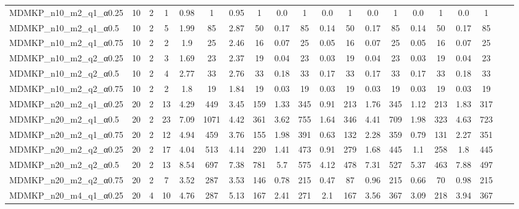 \begin{table}
{\begin{tabular}{lccccccccccccccccccc}
MDMKP\_n10\_m2\_q1\_α0.25 & 10 & 2 & 1 & 0.98 & 1 & 0.95 & 1 &  \textcolor{blue2}{0.0} & 1 &  \textcolor{blue2}{0.0} & 1 &  \textcolor{blue2}{0.0} & 1 &  \textcolor{blue2}{0.0} & 1 &  \textcolor{blue2}{0.0} & 1 \\
MDMKP\_n10\_m2\_q1\_α0.5 & 10 & 2 & 5 & 1.99 & 85 & 2.87 & 50 & 0.17 & 85 &  \textcolor{blue2}{0.14} & 50 & 0.17 & 85 &  \textcolor{blue2}{0.14} & 50 & 0.17 & 85 \\
MDMKP\_n10\_m2\_q1\_α0.75 & 10 & 2 & 2 & 1.9 & 25 & 2.46 & 16 & 0.07 & 25 &  \textcolor{blue2}{0.05} & 16 & 0.07 & 25 &  \textcolor{blue2}{0.05} & 16 & 0.07 & 25 \\
MDMKP\_n10\_m2\_q2\_α0.25 & 10 & 2 & 3 & 1.69 & 23 & 2.37 & 19 & 0.04 & 23 &  \textcolor{blue2}{0.03} & 19 & 0.04 & 23 &  \textcolor{blue2}{0.03} & 19 & 0.04 & 23 \\
MDMKP\_n10\_m2\_q2\_α0.5 & 10 & 2 & 4 & 2.77 & 33 & 2.76 & 33 & 0.18 & 33 &  \textcolor{blue2}{0.17} & 33 &  \textcolor{blue2}{0.17} & 33 &  \textcolor{blue2}{0.17} & 33 & 0.18 & 33 \\
MDMKP\_n10\_m2\_q2\_α0.75 & 10 & 2 & 2 & 1.8 & 19 & 1.84 & 19 &  \textcolor{blue2}{0.03} & 19 &  \textcolor{blue2}{0.03} & 19 &  \textcolor{blue2}{0.03} & 19 &  \textcolor{blue2}{0.03} & 19 &  \textcolor{blue2}{0.03} & 19 \\
MDMKP\_n20\_m2\_q1\_α0.25 & 20 & 2 & 13 & 4.29 & 449 & 3.45 & 159 & 1.33 & 345 &  \textcolor{blue2}{0.91} & 213 & 1.76 & 345 & 1.12 & 213 & 1.83 & 317 \\
MDMKP\_n20\_m2\_q1\_α0.5 & 20 & 2 & 23 & 7.09 & 1071 & 4.42 & 361 & 3.62 & 755 &  \textcolor{blue2}{1.64} & 346 & 4.41 & 709 & 1.98 & 323 & 4.63 & 723 \\
MDMKP\_n20\_m2\_q1\_α0.75 & 20 & 2 & 12 & 4.94 & 459 & 3.76 & 155 & 1.98 & 391 &  \textcolor{blue2}{0.63} & 132 & 2.28 & 359 & 0.79 & 131 & 2.27 & 351 \\
MDMKP\_n20\_m2\_q2\_α0.25 & 20 & 2 & 17 & 4.04 & 513 & 4.14 & 220 & 1.41 & 473 &  \textcolor{blue2}{0.91} & 279 & 1.68 & 445 & 1.1 & 258 & 1.8 & 445 \\
MDMKP\_n20\_m2\_q2\_α0.5 & 20 & 2 & 13 & 8.54 & 697 & 7.38 & 781 & 5.7 & 575 &  \textcolor{blue2}{4.12} & 478 & 7.31 & 527 & 5.37 & 463 & 7.88 & 497 \\
MDMKP\_n20\_m2\_q2\_α0.75 & 20 & 2 & 7 & 3.52 & 287 & 3.53 & 146 & 0.78 & 215 &  \textcolor{blue2}{0.47} & 87 & 0.96 & 215 & 0.66 & 70 & 0.98 & 215 \\
MDMKP\_n20\_m4\_q1\_α0.25 & 20 & 4 & 10 & 4.76 & 287 & 5.13 & 167 & 2.41 & 271 &  \textcolor{blue2}{2.1} & 167 & 3.56 & 367 & 3.09 & 218 & 3.94 & 367 \\

\end{tabular}}
\end{table}

